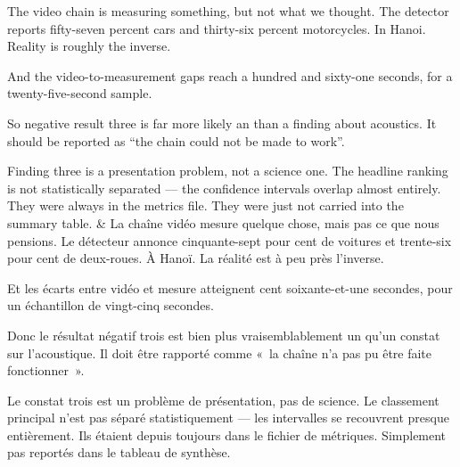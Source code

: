 \documentclass[10pt,a4paper]{article}
\begin{document}
\begin{say}
The video chain is measuring something, but not what we thought. The detector
reports fifty-seven percent cars and thirty-six percent motorcycles. In Hanoi.
Reality is roughly the inverse.

And the video-to-measurement gaps reach a hundred and sixty-one seconds, for a
twenty-five-second sample.

So negative result three is far more likely an  than a
finding about acoustics. It should be reported as ``the chain could not be made to
work''. 

Finding three is a presentation problem, not a science one. The headline ranking
is not statistically separated --- the confidence intervals overlap almost
entirely. They were always in the metrics file. They were just not carried into
the summary table.
&
La chaîne vidéo mesure quelque chose, mais pas ce que nous pensions. Le détecteur
annonce cinquante-sept pour cent de voitures et trente-six pour cent de
deux-roues. À Hanoï. La réalité est à peu près l'inverse.

Et les écarts entre vidéo et mesure atteignent cent soixante-et-une secondes, pour
un échantillon de vingt-cinq secondes.

Donc le résultat négatif trois est bien plus vraisemblablement un  qu'un constat sur l'acoustique. Il doit être rapporté comme «~la
chaîne n'a pas pu être faite fonctionner~». 

Le constat trois est un problème de présentation, pas de science. Le classement
principal n'est pas séparé statistiquement --- les intervalles se recouvrent
presque entièrement. Ils étaient depuis toujours dans le fichier de métriques.
Simplement pas reportés dans le tableau de synthèse.
\end{say}
\end{document}
